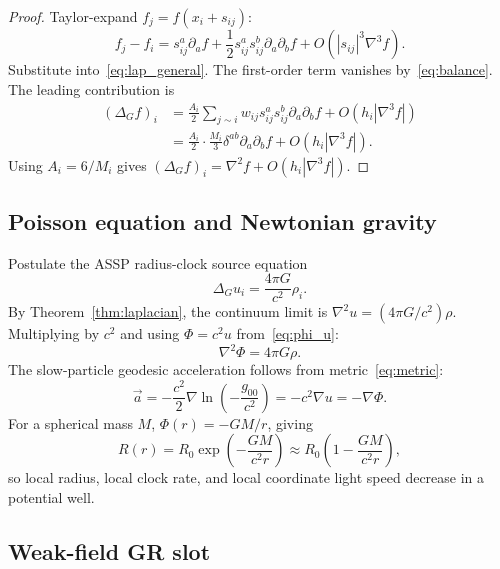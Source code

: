 \documentclass[11pt,a4paper]{article}
\begin{document}
\begin{proof}
Taylor-expand $f_j=f(x_i+s_{ij})$:
\begin{equation}
  f_j-f_i=s_{ij}^a\partial_a f+\frac12s_{ij}^as_{ij}^b\partial_a\partial_bf
  +O(|s_{ij}|^3\nabla^3f).
  \label{eq:taylor}
\end{equation}
Substitute into~\eqref{eq:lap_general}. The first-order term vanishes
by~\eqref{eq:balance}. The leading contribution is
\begin{align}
  (\Delta_G f)_i
  &=\frac{A_i}{2}\sum_{j\sim i}w_{ij}s_{ij}^as_{ij}^b\partial_a\partial_bf
     +O(h_i|\nabla^3f|) \nonumber\\
  &=\frac{A_i}{2}\cdot\frac{M_i}{3}\delta^{ab}\partial_a\partial_bf
     +O(h_i|\nabla^3f|). \nonumber
\end{align}
Using $A_i=6/M_i$ gives $(\Delta_G f)_i=\nabla^2f+O(h_i|\nabla^3f|)$.
\end{proof}

\subsection{Poisson equation and Newtonian gravity}

Postulate the ASSP radius-clock source equation
\begin{equation}
  \Delta_Gu_i=\frac{4\pi G}{c^2}\rho_i.
  \label{eq:discrete_poisson}
\end{equation}
By Theorem~\ref{thm:laplacian}, the continuum limit is
$\nabla^2u=(4\pi G/c^2)\rho$. Multiplying by $c^2$ and using
$\Phi=c^2u$ from~\eqref{eq:phi_u}:
\begin{equation}
  \boxed{\nabla^2\Phi=4\pi G\rho.}
  \label{eq:poisson}
\end{equation}
The slow-particle geodesic acceleration follows from metric~\eqref{eq:metric}:
\begin{equation}
  \vec a=-\frac{c^2}{2}\nabla\ln\!\left(-\frac{g_{00}}{c^2}\right)
  =-c^2\nabla u=-\nabla\Phi.
  \label{eq:acceleration}
\end{equation}
For a spherical mass $M$, $\Phi(r)=-GM/r$, giving
\begin{equation}
  R(r)=R_0\exp\!\left(-\frac{GM}{c^2r}\right)
  \approx R_0\!\left(1-\frac{GM}{c^2r}\right),
  \label{eq:R_point}
\end{equation}
so local radius, local clock rate, and local coordinate light speed decrease
in a potential well.

\subsection{Weak-field GR slot}
\end{document}
